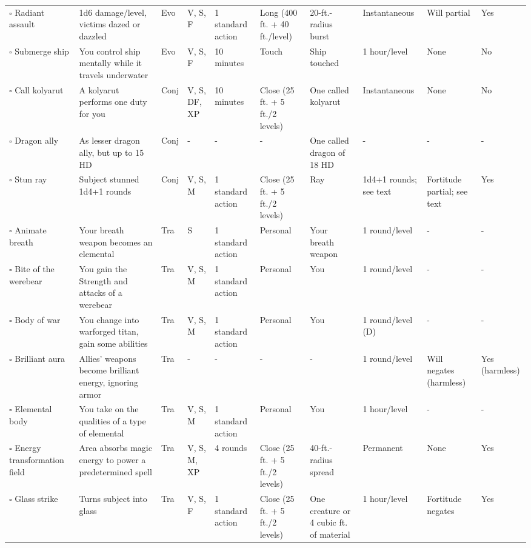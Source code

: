 \documentclass[12pt, a4paper]{article}
\begin{document}
\begin{center}
\begin{longtable}[H]{ p{8em} p{15em} p{2em} p{5em} p{6em} p{6em} p{10em} p{6em} p{5em} p{2em} }
    \(\square\) Radiant assault & 1d6 damage/level, victims dazed or dazzled & Evo & V, S, F & 1 standard action & Long (400 ft. + 40 ft./level) & 20-ft.- radius burst & Instantaneous & Will partial & Yes\\
    \(\square\) Submerge ship & You control ship mentally while it travels underwater & Evo & V, S, F & 10 minutes & Touch & Ship touched & 1 hour/level & None & No\\
    \(\square\) Call kolyarut & A kolyarut performs one duty for you & Conj & V, S, DF, XP & 10 minutes & Close (25 ft. + 5 ft./2 levels) & One called kolyarut & Instantaneous & None & No\\
    \(\square\) Dragon ally & As lesser dragon ally, but up to 15 HD & Conj & - & - & - & One called dragon of 18 HD  & - & - & -\\
    \(\square\) Stun ray & Subject stunned 1d4+1 rounds & Conj & V, S, M & 1 standard action & Close (25 ft. + 5 ft./2 levels) & Ray & 1d4+1 rounds; see text & Fortitude partial; see text & Yes\\
    \(\square\) Animate breath & Your breath weapon becomes an elemental & Tra & S & 1 standard action & Personal & Your breath weapon & 1 round/level & - & -\\
    \(\square\) Bite of the werebear & You gain the Strength and attacks of a werebear & Tra & V, S, M & 1 standard action & Personal & You & 1 round/level & - & -\\
    \(\square\) Body of war & You change into warforged titan, gain some abilities & Tra & V, S, M & 1 standard action & Personal & You & 1 round/level (D) & - & -\\
    \(\square\) Brilliant aura & Allies’ weapons become brilliant energy, ignoring armor & Tra & - & - & - & - & 1 round/level & Will negates (harmless) & Yes (harmless)\\
    \(\square\) Elemental body & You take on the qualities of a type of elemental & Tra & V, S, M & 1 standard action & Personal & You & 1 hour/level & - & -\\
    \(\square\) Energy transformation field & Area absorbs magic energy to power a predetermined spell & Tra & V, S, M, XP & 4 rounds & Close (25 ft. + 5 ft./2 levels) & 40-ft.-radius spread & Permanent & None & Yes\\
    \(\square\) Glass strike & Turns subject into glass & Tra & V, S, F & 1 standard action & Close (25 ft. + 5 ft./2 levels) & One creature or 4 cubic ft. of material & 1 hour/level & Fortitude negates & Yes\\

\end{longtable}
\end{center}
\end{document}

